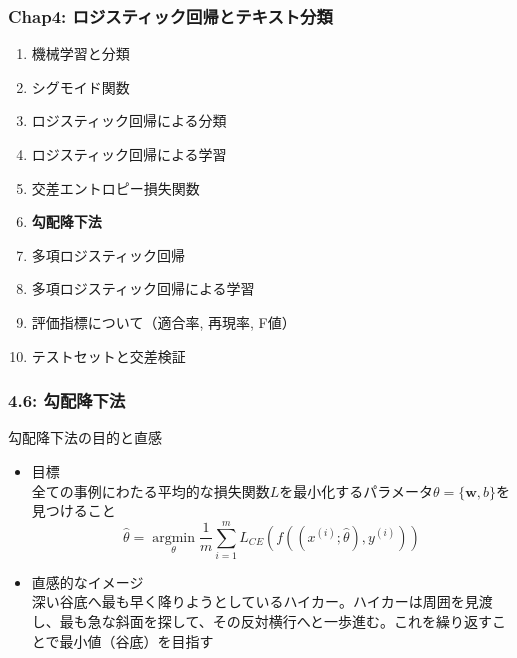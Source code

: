 \documentclass[unicode,11pt]{beamer} %
\begin{document}

\begin{frame}
    \frametitle{Chap4: ロジスティック回帰とテキスト分類}
    \begin{block}{}
        \begin{enumerate}
            \item 機械学習と分類
            \item シグモイド関数
            \item ロジスティック回帰による分類
            \item ロジスティック回帰による学習
            \item 交差エントロピー損失関数
            \item {\color{red}\textbf{勾配降下法}}
            \item 多項ロジスティック回帰
            \item 多項ロジスティック回帰による学習
            \item 評価指標について（適合率, 再現率, F値）
            \item テストセットと交差検証
        \end{enumerate}
    \end{block}
\end{frame}



\begin{frame}
    \frametitle{4.6: 勾配降下法}
    \begin{alertblock}{勾配降下法の目的と直感}
        \begin{itemize}
            \item 目標\\全ての事例にわたる平均的な損失関数$L$を最小化するパラメータ$\theta = \{ \boldsymbol{w}, b\}$を見つけること
            \begin{equation*}
                \hat{\theta} = \underset{\theta}{\operatorname{argmin}} \frac{1}{m} \sum_{i=1}^m L_{CE} (f((x^{(i)};\hat{\theta}), y^{(i)}))
            \end{equation*}
            \item 直感的なイメージ\\深い谷底へ最も早く降りようとしているハイカー。ハイカーは周囲を見渡し、最も急な斜面を探して、その反対横行へと一歩進む。これを繰り返すことで最小値（谷底）を目指す
        \end{itemize}
    \end{alertblock}
\end{frame}
\end{document}
